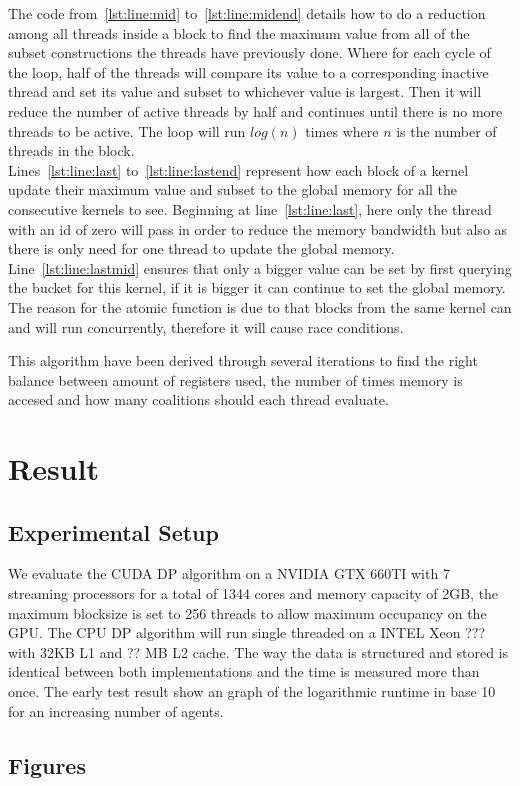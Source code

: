 \documentclass[a4paper, 12pt]{report}
\begin{document}
The code from~\ref{lst:line:mid} to~\ref{lst:line:midend} details how to do a reduction among all threads inside a block to find the maximum value from all of the subset constructions the threads have previously done. Where for each cycle of the loop, half of the threads will compare its value to a corresponding inactive thread and set its value and subset to whichever value is largest. Then it will reduce the number of active threads by half and continues until there is no more threads to be active. The loop will run $log(n)$ times where $n$ is the number of threads in the block.\\

Lines~\ref{lst:line:last} to~\ref{lst:line:lastend} represent how each block of a kernel update their maximum value and subset to the global memory for all the consecutive kernels to see. Beginning at line~\ref{lst:line:last}, here only the thread with an id of zero will pass in order to reduce the memory bandwidth but also as there is only need for one thread to update the global memory. Line~\ref{lst:line:lastmid} ensures that only a bigger value can be set by first querying the bucket for this kernel, if it is bigger it can continue to set the global memory. The reason for the atomic function is due to that blocks from the same kernel can and will run concurrently, therefore it will cause race conditions.

This algorithm have been derived through several iterations to find the right balance between amount of registers used, the number of times memory is accesed and how many coalitions should each thread evaluate. 
\newpage
\section{Result}
\subsection{Experimental Setup}
We evaluate the CUDA DP algorithm on a NVIDIA GTX 660TI with 7 streaming processors for a total of 1344 cores and memory capacity of 2GB, the maximum blocksize is set to 256 threads to allow maximum occupancy on the GPU. The  CPU DP algorithm will run single threaded on a INTEL Xeon ??? with 32KB L1 and ?? MB L2 cache. The way the data is structured and stored is identical between both implementations and the time is measured more than once. The early test result show an graph of the logarithmic runtime in base 10 for an increasing number of agents.
\subsection{Figures}
\end{document}
